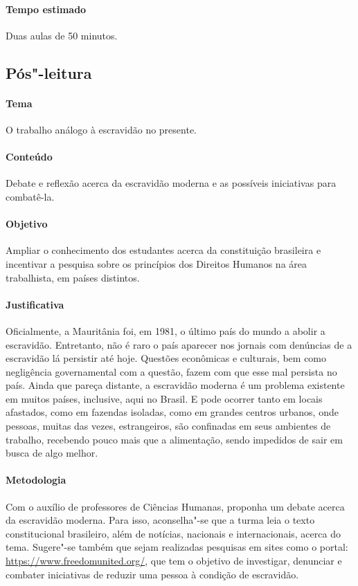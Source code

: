 \documentclass[12pt]{extarticle}
\begin{document}
\paragraph{Tempo estimado} Duas aulas de 50 minutos.

\subsection{Pós"-leitura}

\paragraph{Tema} O trabalho análogo à escravidão no presente.

\paragraph{Conteúdo} Debate e reflexão acerca da escravidão
moderna e as possíveis iniciativas para combatê-la.

\paragraph{Objetivo} Ampliar o conhecimento dos estudantes
acerca da constituição brasileira e incentivar a pesquisa
sobre os princípios dos Direitos Humanos na área trabalhista, em países distintos.

\paragraph{Justificativa} Oficialmente, a Mauritânia foi, em 1981, o último país do
mundo a abolir a escravidão. Entretanto, não é raro o país aparecer nos
jornais com denúncias de a escravidão lá persistir até hoje. Questões
econômicas e culturais, bem como negligência governamental com a
questão, fazem com que esse mal persista no país. Ainda que pareça
distante, a escravidão moderna é um problema existente em muitos países,
inclusive, aqui no Brasil. E pode ocorrer tanto em locais afastados,
como em fazendas isoladas, como em grandes centros urbanos, onde
pessoas, muitas das vezes, estrangeiros, são confinadas em seus
ambientes de trabalho, recebendo pouco mais que a
alimentação, sendo impedidos de sair em busca de algo melhor. 

\paragraph{Metodologia} Com o auxílio de professores de Ciências Humanas, 
proponha um debate acerca da escravidão moderna.
Para isso, aconselha"-se que a turma leia o texto constitucional
brasileiro, além de notícias, nacionais e internacionais, acerca do tema.
Sugere"-se também que sejam realizadas pesquisas em sites como
o portal:
\url{https://www.freedomunited.org/}, que tem o objetivo de investigar, 
denunciar e combater iniciativas de reduzir uma pessoa à condição de escravidão.
\end{document}
